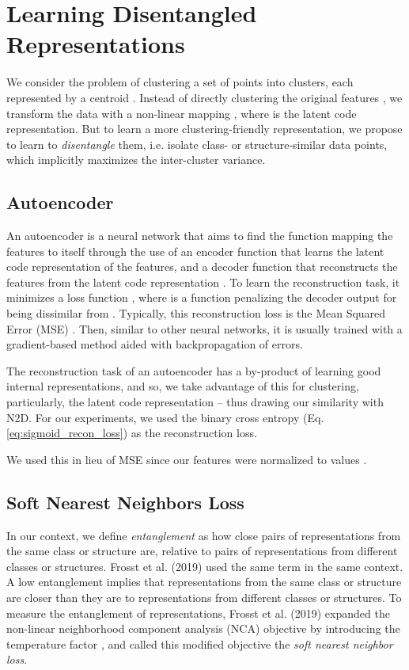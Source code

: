 \documentclass[conference]{IEEEtran}
\begin{document}
\section{Learning Disentangled Representations}\label{section:learning_disentangled_representations}
We consider the problem of clustering a set of  points  into  clusters, each represented by a centroid . Instead of directly clustering the original features , we transform the data with a non-linear mapping , where  is the latent code representation. But to learn a more clustering-friendly representation, we propose to learn to \textit{disentangle} them, i.e. isolate class- or structure-similar data points, which implicitly maximizes the inter-cluster variance.


\subsection{Autoencoder}
An autoencoder is a neural network that aims to find the function mapping the features  to itself through the use of an encoder function  that learns the latent code representation of the features, and a decoder function that reconstructs the features from the latent code representation . To learn the reconstruction task, it minimizes a loss function , where  is a function penalizing the decoder output  for being dissimilar from . Typically, this reconstruction loss is the Mean Squared Error (MSE) . Then, similar to other neural networks, it is usually trained with a gradient-based method aided with backpropagation of errors.

The reconstruction task of an autoencoder has a by-product of learning good internal representations, and so, we take advantage of this for clustering, particularly, the latent code representation  -- thus drawing our similarity with N2D\cite{mcconville2019n2d}. For our experiments, we used the binary cross entropy (Eq. \ref{eq:sigmoid_recon_loss}) as the reconstruction loss.

We used this in lieu of MSE since our features  were normalized to values .
\subsection{Soft Nearest Neighbors Loss}
In our context, we define \textit{entanglement} as how close pairs of representations from the same class or structure are, relative to pairs of representations from different classes or structures. Frosst et al. (2019)\cite{frosst2019analyzing} used the same term in the same context. A low entanglement implies that representations from the same class or structure are closer than they are to representations from different classes or structures. To measure the entanglement of representations, Frosst et al. (2019)\cite{frosst2019analyzing} expanded the non-linear neighborhood component analysis (NCA)\cite{salakhutdinov2007learning} objective by introducing the temperature factor , and called this modified objective the \textit{soft nearest neighbor loss}.
\end{document}
